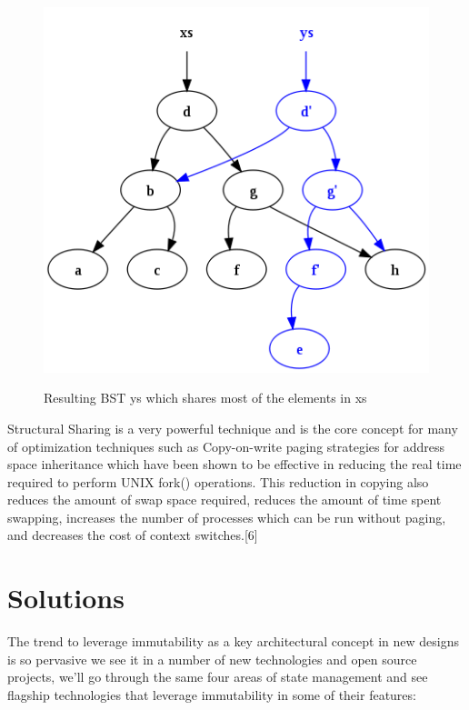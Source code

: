 \documentclass[12pt,twoside]{article}
\begin{document}
\begin{figure}[H]
    \begin{center}
        {\includegraphics[scale=.6]{structuralSharing.png}}
       \end{center}
       \caption{ \label{figure:2} Resulting BST ys which shares most of the elements in xs}
\end{figure}
Structural Sharing is a very powerful technique and is the core concept for many of optimization techniques such as Copy-on-write paging strategies for address space
inheritance which have been shown to be effective in reducing the
real time required to perform UNIX fork() operations. This reduction in copying also reduces the amount of
swap space required, reduces the amount of time spent swapping, increases the number of processes which can be run
without paging, and decreases the cost of context switches.[6]


\newpage
\section{Solutions}


The trend to leverage immutability as a key architectural concept in new designs is so pervasive we see it in a number of new technologies and open source projects, we'll go through the same four areas of state management and see flagship technologies that leverage immutability in some of their features:
\end{document}
